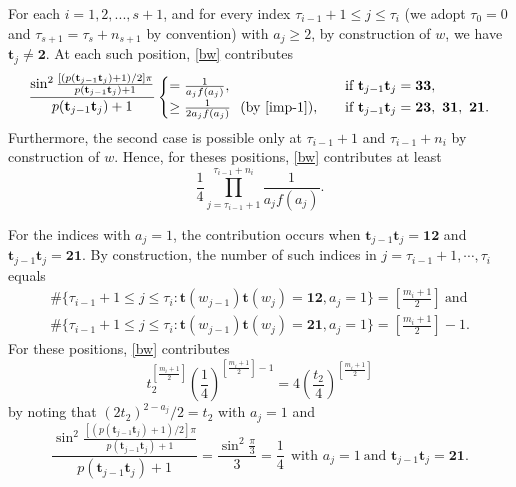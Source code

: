 \documentclass[reqno,11pt,graphicx,]{amsart}
\numberwithin{equation}{section}
\theoremstyle{plain}
\newcommand{\3}{\mathbf{3}}
\begin{document}
	For each $i=1,2,...,s+1$, and for every index $\tau_{i-1}+1\leq j\leq \tau_i$ (we adopt $\tau_{0}=0$ and $\tau_{s+1}=\tau_{s}+n_{s+1}$ by convention) with $a_j\ge2$, by construction of $w$, we have $\mathbf{t}_j\neq\mathbf{2}$. At each such position, \eqref{bw} contributes
	\begin{equation*}
		\frac{\sin^2\frac{[(p(\mathbf{t}_{j-1}\mathbf{t}_j)+1)/2]\pi}{p(\mathbf{t}_{j-1}\mathbf{t}_j)+1}}
		{p(\mathbf{t}_{j-1}\mathbf{t}_j)+1}
		\begin{cases}
			=\frac1{a_jf(a_j)},\quad&\text{if}\ \mathbf{t}_{j-1}\mathbf{t}_j=\mathbf{3}\mathbf{3},\\
			\ge \frac1{2a_jf(a_j)} \ \ (\text{by \eqref{imp-1}}),\quad&\text{if}\ \mathbf{t}_{j-1}\mathbf{t}_j=\mathbf{2}\mathbf{3},\ \mathbf{3}\mathbf{1},\ \mathbf{2}\mathbf{1}.
		\end{cases}
	\end{equation*}
	Furthermore, the second case is possible only at $\tau_{i-1}+1$ and $\tau_{i-1}+n_i$ by construction of $w$. Hence, for theses positions, \eqref{bw} contributes at least
	\begin{equation}\label{es1}
		\frac{1}{4}\prod_{j=\tau_{i-1}+1}^{\tau_{i-1}+n_i}\frac1{a_jf(a_j)}.
	\end{equation}
	
	For the indices with $a_j=1$, the contribution occurs
	when $\mathbf{t}_{j-1}\mathbf{t}_j=\mathbf{1}\mathbf{2}$ and $\mathbf{t}_{j-1}\mathbf{t}_j=\mathbf{2}\mathbf{1}$. By construction, the number of such indices in $j=\tau_{i-1}+1,\cdots,\tau_i$ equals
	\begin{align*}
		\#\{\tau_{i-1}+1\leq j\leq \tau_i:\mathbf{t}(w_{j-1})\mathbf{t}(w_j)=\mathbf{1}\mathbf{2},a_{j}=1\}
		=\left[\frac{m_i+1}{2}\right] \ \text{and} \\
		\#\{\tau_{i-1}+1\leq j\leq \tau_i:\mathbf{t}(w_{j-1})\mathbf{t}(w_j)=\mathbf{2}\mathbf{1},a_{j}=1\}
		=\left[\frac{m_i+1}{2}\right]-1.
	\end{align*}
	For these positions, \eqref{bw} contributes
	\begin{equation}\label{es2}
		t_2^{\left[\frac{m_i+1}{2}\right]}\left(\frac{1}{4}\right)^{\left[\frac{m_i+1}{2}\right]-1}
		=4\left(\frac{t_2}{4}\right)^{\left[\frac{m_i+1}{2}\right]}
	\end{equation}
	by noting that $(2t_2)^{2-a_j}/2=t_2$ with $a_{j}=1$ and 
	\begin{equation*}
		\frac{\sin^2\frac{[(p(\mathbf{t}_{j-1} \mathbf{t}_j)+1)/2]\pi}{p(\mathbf{t}_{j-1} \mathbf{t}_j)+1}}{p(\mathbf{t}_{j-1} \mathbf{t}_j)+1}
		=  \frac{\sin^2\frac{\pi}{3}}{3}=\frac{1}{4}\ \  \text{with } a_{j}=1 \ \text{and }\mathbf{t}_{j-1} \mathbf{t}_j=\mathbf{21}. 
	\end{equation*}
	
\end{document}
